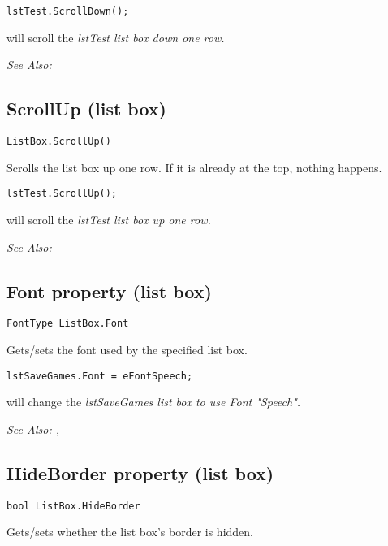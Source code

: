 \begin{verbatim}
lstTest.ScrollDown();
\end{verbatim}
will scroll the \it{lstTest} list box down one row.

\it{See Also:} 


\subsection{ScrollUp (list box)}\label{ListBox.ScrollUp}%

\begin{verbatim}
ListBox.ScrollUp()
\end{verbatim}
Scrolls the list box up one row. If it is already at the top, nothing happens.

\begin{verbatim}
lstTest.ScrollUp();
\end{verbatim}
will scroll the \it{lstTest} list box up one row.

\it{See Also:} 


\subsection{Font property (list box)}\label{ListBox.Font}%

\begin{verbatim}
FontType ListBox.Font
\end{verbatim}

Gets/sets the font used by the specified list box.

\begin{verbatim}
lstSaveGames.Font = eFontSpeech;
\end{verbatim}
will change the \it{lstSaveGames} list box to use Font "Speech".

\it{See Also:} , 


\subsection{HideBorder property (list box)}\label{ListBox.HideBorder}%

\begin{verbatim}
bool ListBox.HideBorder
\end{verbatim}
Gets/sets whether the list box's border is hidden.


